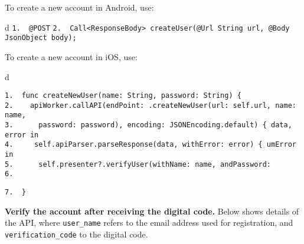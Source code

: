 \documentclass[a4paper,12pt]{book}
\begin{document}
To create a new account in Android, use:

\begin{codebloc}
\begin{tabular}{d}
\verb|1.  @POST|\newline
\verb|2.  Call<ResponseBody> createUser(@Url String url, @Body JsonObject body);|
\end{tabular}
\end{codebloc}


To create a new account in iOS, use:

\begin{codebloc}
\begin{tabular}{d}
\vspace{2pt}
\begin{verbatim}
1.  func createNewUser(name: String, password: String) {
2.    apiWorker.callAPI(endPoint: .createNewUser(url: self.url, name: name,
3.      password: password), encoding: JSONEncoding.default) { data, error in
4.     self.apiParser.parseResponse(data, withError: error) { umError in
5.      self.presenter?.verifyUser(withName: name, andPassword:
6.
\end{verbatim}
\verb|7.  }|
\end{tabular}
\end{codebloc}



\textbf{Verify the account after receiving the digital code.} Below shows details of the API, where \verb|user_name| refers to the email address used for registration, and \verb|verification_code| to the digital code.
\end{document}
